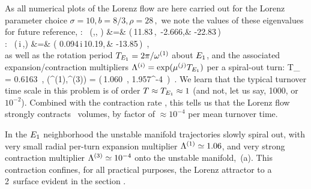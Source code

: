 {As all numerical plots of the Lorenz flow are
here carried out for the Lorenz parameter choice
\(
    \sigma = 10, b= 8/3, \rho = 28
\,,
\)
we note the values of these eigenvalues for future reference,
\beq
{}
:~
(\eigExp[1],\eigExp[2], \eigExp[3])
    &=& (\,11.83\,,~-2.666,& -22.83\,)   \\
:~
(\eigRe[1] \pm\,i\,\eigIm[1],\eigExp[3])
    &=& (\,\,0.094\,\pm i\,10.19,\,& -13.85\,) \,, \\
\earr
\label{EqLorenzStab}
\eeq
as
well as the rotation period
$T_{\EQV{1}} = 2\pi/\eigIm[1]$ about $E_{1}$,
and the  associated expansion/contraction multipliers
$\ExpaEig^{(i)} = \exp(\eigRe[j] T_{\EQV{1}})$
per a spiral-out turn:
\beq
T_{} =  0.6163 \,, \qquad
(\ExpaEig^{(1)},\ExpaEig^{(3)})
   = (\,1.060 \,, 1.957^{-4} \,)
\,.
\label{EqLorenzMltp}
\eeq
We learn that the typical turnover time scale in this problem is
of order $T \approx T_{E_{1}} \approx 1$
(and not, let us say, 1000, or $10^{-2}$). Combined with
the contraction rate , this tells us that
the Lorenz flow strongly contracts \statesp\ volumes, by factor of
$ \approx 10^{-4}$ per mean turnover time.

In the $E_{1}$ neighborhood the unstable manifold
trajectories slowly spiral out, with
very small radial  per-turn expansion multiplier
$\Lambda^{(1)} \simeq  1.06$,
and very strong contraction multiplier
$\Lambda^{(3)}  \simeq 10^{-4}$
onto the unstable manifold,
\,(a).
This contraction confines, for all practical purposes,
the Lorenz attractor to a 2\dmn\ surface
evident in the section .


}
